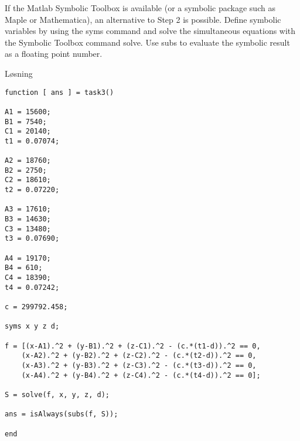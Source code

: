 % 

If the Matlab Symbolic Toolbox is available (or a symbolic package such as Maple
or Mathematica), an alternative to Step 2 is possible. Define symbolic variables by using the syms command and solve the simultaneous equations with the Symbolic Toolbox command solve. Use subs to evaluate the symbolic result as a floating point number.

\vspace{5mm}

Løsning


\begin{lstlisting}[caption={Task3.m}]
function [ ans ] = task3()

A1 = 15600;
B1 = 7540;
C1 = 20140;
t1 = 0.07074;

A2 = 18760;
B2 = 2750;
C2 = 18610;
t2 = 0.07220;

A3 = 17610;
B3 = 14630;
C3 = 13480;
t3 = 0.07690;

A4 = 19170;
B4 = 610;
C4 = 18390;
t4 = 0.07242;

c = 299792.458;

syms x y z d;

f = [(x-A1).^2 + (y-B1).^2 + (z-C1).^2 - (c.*(t1-d)).^2 == 0,
    (x-A2).^2 + (y-B2).^2 + (z-C2).^2 - (c.*(t2-d)).^2 == 0, 
    (x-A3).^2 + (y-B3).^2 + (z-C3).^2 - (c.*(t3-d)).^2 == 0, 
    (x-A4).^2 + (y-B4).^2 + (z-C4).^2 - (c.*(t4-d)).^2 == 0];

S = solve(f, x, y, z, d);

ans = isAlways(subs(f, S));

end
\end{lstlisting}

% 